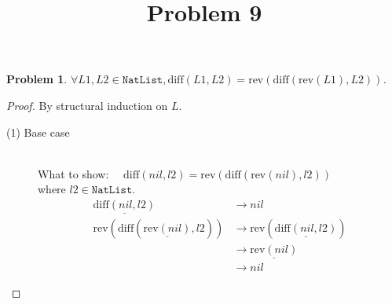 \documentclass[12pt, a4paper]{article}
\title{Problem 9}
\date{\vspace{-5ex}}
\newtheorem{problem}{Problem}
\newcommand{\rmx}[1]{\mathrm{#1}}
\newcommand{\larrow}{\longrightarrow}
\newcommand{\under}{\underline}
\begin{document}
\maketitle

\begin{problem}
$\forall L1, L2 \in \mathtt{NatList}, \rmx{diff}(L1, L2) = \rmx{rev}(\rmx{diff}(\rmx{rev}(L1), L2))$.
\end{problem}
\begin{proof}
By structural induction on $L$.

\begin{description}
\item[(1) Base case]~\\
\noindent
What to show: $\quad \rmx{diff}(nil, l2) = \rmx{rev}(\rmx{diff}(\rmx{rev}(nil), l2))$ \\
where $l2 \in \mathtt{NatList}$.
\begin{align*}
\under{\rmx{diff}(nil, l2)}
	&\larrow nil \tag{by diff1} \\
\rmx{rev}(\rmx{diff}(\under{\rmx{rev}(nil)}, l2))
	&\larrow \rmx{rev}(\under{\rmx{diff}(nil, l2)}) \tag{by rev1} \\
	&\larrow \under{\rmx{rev}(nil)} \tag{by diff1} \\
	&\larrow nil \tag{by rev1}
\end{align*}


\end{description}
\end{proof}
\end{document}

